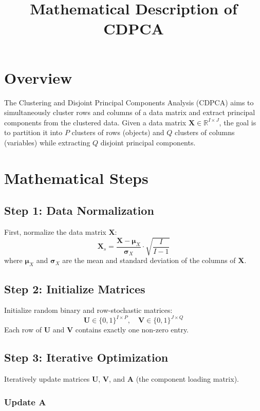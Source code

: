 \documentclass{article}
\begin{document}
\title{Mathematical Description of CDPCA}
\author{}
\date{}
\maketitle

\section*{Overview}

The Clustering and Disjoint Principal Components Analysis (CDPCA) aims to simultaneously cluster rows and columns of a data matrix and extract principal components from the clustered data. Given a data matrix $\bm{X} \in \mathbb{R}^{I \times J}$, the goal is to partition it into $P$ clusters of rows (objects) and $Q$ clusters of columns (variables) while extracting $Q$ disjoint principal components.

\section*{Mathematical Steps}

\subsection*{Step 1: Data Normalization}
First, normalize the data matrix $\bm{X}$:
\[
\bm{X}_s = \frac{\bm{X} - \bm{\mu}_X}{\bm{\sigma}_X} \cdot \sqrt{\frac{I}{I-1}}
\]
where $\bm{\mu}_X$ and $\bm{\sigma}_X$ are the mean and standard deviation of the columns of $\bm{X}$.

\subsection*{Step 2: Initialize Matrices}
Initialize random binary and row-stochastic matrices:
\[
\bm{U} \in \{0,1\}^{I \times P}, \quad \bm{V} \in \{0,1\}^{J \times Q}
\]
Each row of $\bm{U}$ and $\bm{V}$ contains exactly one non-zero entry.

\subsection*{Step 3: Iterative Optimization}
Iteratively update matrices $\bm{U}$, $\bm{V}$, and $\bm{A}$ (the component loading matrix).

\subsubsection*{Update $\bm{A}$}
\end{document}
